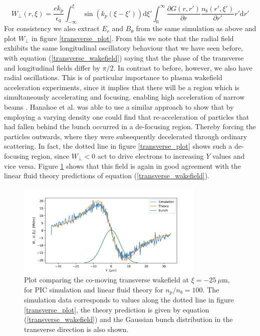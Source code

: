\begin{equation}
W_{\perp}(r,\xi)=\frac{e k_p}{\epsilon_0} \int_{-\infty}^{\xi} \sin(k_p(\xi-\xi'))\mathrm{d}\xi' \int_{0}^{\infty}\frac{\partial G\left(r,r'\right)}{\partial r} \frac{n_b(r',\xi')}{\partial r'}
r'\mathrm{d}r'
\label{transverse_wakefield}
\end{equation}
For consistency we also extract $E_r$ and $B_{\theta}$ from the same simulation as above and plot $W_{\perp}$ in figure \ref{transverse_plot}.  From this we note that the radial field exhibits the same longitudinal oscillatory behaviour that we have seen before, with equation (\ref{transverse_wakefield}) saying that the phase of the transverse and longitudinal fields differ by $\pi/2$. In contrast to before, however, we also have radial oscillations. This is of particular importance to plasma wakefield acceleration experiments, since it implies that there will be a region which is simultaneously accelerating and focusing, enabling high acceleration of narrow beams \cite{Esarey2009}. Hanahoe et al. \cite{Hanahoe2017} was able to use a similar approach to show that by employing a varying density one could find that re-acceleration of particles that had fallen behind the bunch occurred in a de-focusing region. Thereby forcing the particles outwards, where they were subsequently decelerated through ordinary scattering. In fact, the dotted line in figure \ref{transverse_plot} shows such a de-focusing region, since $W_{\perp}<0$ act to drive electrons to increasing $Y$ values and vice versa.  Figure \ref{theory_vs_simulation_transverse} shows that this field is again in good agreement with the linear fluid theory predictions of equation (\ref{transverse_wakefield}).
\begin{figure}
\centering
\includegraphics[width=0.8\textwidth]{test.pdf}
\caption{\small{Plot comparing the co-moving transverse wakefield at $\xi=-25 ~\mu\text{m}$, for PIC simulation and linear fluid theory for $n_p/n_b=100$. The simulation data corresponds to values along the dotted line in figure \ref{transverse_plot}, the theory prediction is given by equation  (\ref{transverse_wakefield}) and the Gaussian bunch distribution in the transverse direction is also shown.}}
\label{theory_vs_simulation_transverse}
\end{figure}


